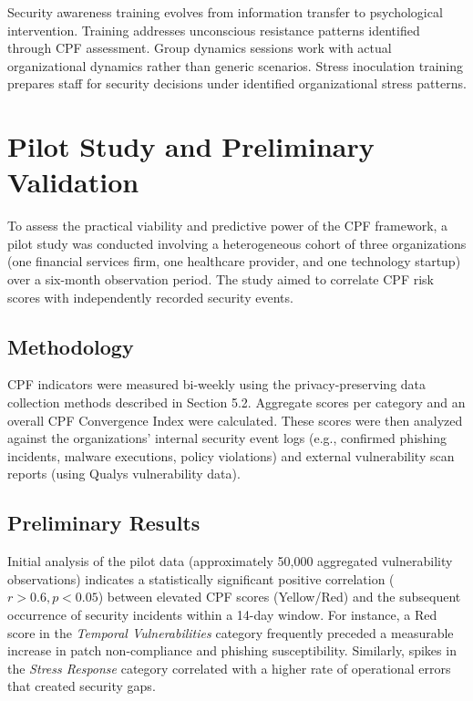 \documentclass[manuscript,screen,review]{acmart}
\begin{document}
Security awareness training evolves from information transfer to psychological intervention. Training addresses unconscious resistance patterns identified through CPF assessment. Group dynamics sessions work with actual organizational dynamics rather than generic scenarios. Stress inoculation training prepares staff for security decisions under identified organizational stress patterns.

\section{Pilot Study and Preliminary Validation}

To assess the practical viability and predictive power of the CPF framework, a pilot study was conducted involving a heterogeneous cohort of three organizations (one financial services firm, one healthcare provider, and one technology startup) over a six-month observation period. The study aimed to correlate CPF risk scores with independently recorded security events.

\subsection{Methodology}
CPF indicators were measured bi-weekly using the privacy-preserving data collection methods described in Section 5.2. Aggregate scores per category and an overall CPF Convergence Index were calculated. These scores were then analyzed against the organizations' internal security event logs (e.g., confirmed phishing incidents, malware executions, policy violations) and external vulnerability scan reports (using Qualys vulnerability data).

\subsection{Preliminary Results}
Initial analysis of the pilot data (approximately 50,000 aggregated vulnerability observations) indicates a statistically significant positive correlation ($ r > 0.6, p < 0.05 $) between elevated CPF scores (Yellow/Red) and the subsequent occurrence of security incidents within a 14-day window. For instance, a Red score in the \textit{Temporal Vulnerabilities} category frequently preceded a measurable increase in patch non-compliance and phishing susceptibility. Similarly, spikes in the \textit{Stress Response} category correlated with a higher rate of operational errors that created security gaps.
\end{document}
